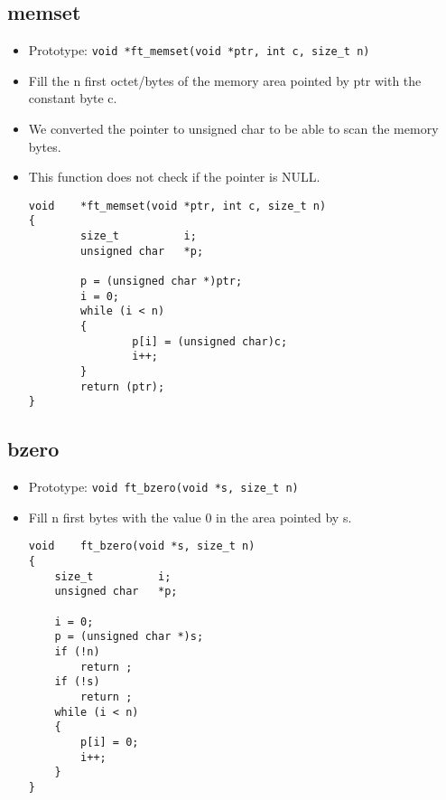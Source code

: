\documentclass{article}
\begin{document}
		\subsection{memset}
			\begin{itemize}[label=$\rightarrow$]
				\item Prototype: \texttt{void    *ft\_memset(void *ptr, int c, size\_t n)}
				\item Fill the n first octet/bytes of the memory area pointed by ptr with the constant byte c.
				\item We converted the pointer to unsigned char to be able to scan the memory bytes.
				\item This function does not check if the pointer is NULL.
				\begin{verbatim}
void    *ft_memset(void *ptr, int c, size_t n)
{
        size_t          i;
        unsigned char   *p;

        p = (unsigned char *)ptr;
        i = 0;
        while (i < n)
        {
                p[i] = (unsigned char)c;
                i++;
        }
        return (ptr);
}
				\end{verbatim}
			\end{itemize}
		
		\subsection{bzero}
			\begin{itemize}[label=$\rightarrow$]
				\item Prototype: \texttt{void ft\_bzero(void *s, size\_t n)}
				\item Fill n first bytes with the value 0 in the area pointed by s.
				\begin{verbatim}
void    ft_bzero(void *s, size_t n)                                             
{                                                                               
    size_t          i;                                                          
    unsigned char   *p;                                                         
                                                                                
    i = 0;                                                                      
    p = (unsigned char *)s;                                                     
    if (!n)                                                                     
        return ;                                                                
    if (!s)                                                                     
        return ;                                                                
    while (i < n)                                                               
    {                                                                           
        p[i] = 0;                                                               
        i++;                                                                    
    }                                                                           
}   
				\end{verbatim}
			\end{itemize}
		
\end{document}
